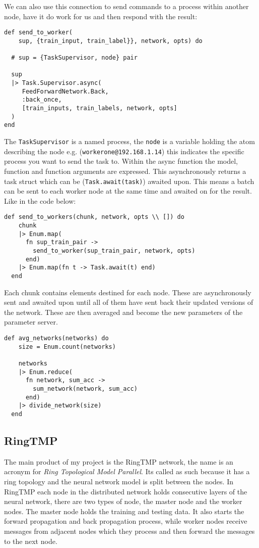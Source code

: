We can also use this connection to send commands to a process within another
node, have it do work for us and then respond with the result:
\begin{lstlisting}[basicstyle=\linespread{0.8}\ttfamily\footnotesize]
def send_to_worker(
    sup, {train_input, train_label}}, network, opts) do

  # sup = {TaskSupervisor, node} pair

  sup
  |> Task.Supervisor.async(
     FeedForwardNetwork.Back,
     :back_once,
     [train_inputs, train_labels, network, opts]
  )
end
\end{lstlisting}
The \lstinline{TaskSupervisor} is a named process, the \lstinline{node} is a
variable holding the atom describing the node e.g.
(\lstinline{workerone@192.168.1.14}) this indicates the specific process you
want to send the task to. Within the async function the model, function and
function arguments are expressed. This asynchronously returns a task struct
which can be (\lstinline{Task.await(task)}) awaited upon. This means a batch can
be sent to each worker node at the same time and awaited on for the result. Like
in the code below:
\begin{lstlisting}[basicstyle=\linespread{0.8}\ttfamily\footnotesize]
  def send_to_workers(chunk, network, opts \\ []) do
    chunk
    |> Enum.map(
      fn sup_train_pair ->
        send_to_worker(sup_train_pair, network, opts)
      end)
    |> Enum.map(fn t -> Task.await(t) end)
  end
\end{lstlisting}
Each chunk contains elements destined for each node. These are asynchronously
sent and awaited upon until all of them have sent back their updated versions of
the network. These are then averaged and become the new parameters of the
parameter server.
\begin{lstlisting}[basicstyle=\linespread{0.8}\ttfamily\footnotesize]
  def avg_networks(networks) do
    size = Enum.count(networks)

    networks
    |> Enum.reduce(
      fn network, sum_acc ->
        sum_network(network, sum_acc)
      end)
    |> divide_network(size)
  end
\end{lstlisting}

\subsection{RingTMP}
The main product of my project is the RingTMP network, the name is an acronym
for \textit{Ring Topological Model Parallel}. Its called as such because it has
a ring topology and the neural network model is split between the nodes. In
RingTMP each node in the distributed network holds consecutive layers of the
neural network, there are two types of node, the master node and the worker
nodes. The master node holds the training and testing data. It also starts the
forward propagation and back propagation process, while worker nodes receive
messages from adjacent nodes which they process and then forward the messages to
the next node.

